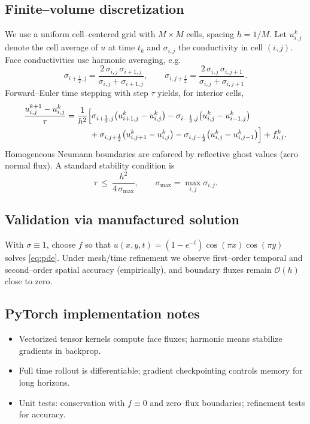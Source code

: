 \documentclass[11pt,a4paper]{article}
\numberwithin{equation}{section}
\newcommand{\Oh}{\mathcal{O}}
\begin{document}
\subsection{Finite--volume discretization}
We use a uniform cell--centered grid with $M\times M$ cells, spacing $h=1/M$.
Let $u^k_{i,j}$ denote the cell average of $u$ at time $t_k$ and $\sigma_{i,j}$ the conductivity in cell $(i,j)$.
Face conductivities use harmonic averaging, e.g.
\begin{equation}
  \sigma_{i+\frac12,j}=\frac{2\,\sigma_{i,j}\,\sigma_{i+1,j}}{\sigma_{i,j}+\sigma_{i+1,j}},
  \qquad
  \sigma_{i,j+\frac12}=\frac{2\,\sigma_{i,j}\,\sigma_{i,j+1}}{\sigma_{i,j}+\sigma_{i,j+1}}.
\end{equation}
Forward--Euler time stepping with step $\tau$ yields, for interior cells,
\begin{align}
\frac{u^{k+1}_{i,j}-u^{k}_{i,j}}{\tau} 
&= \frac{1}{h^2}\Big[
  \sigma_{i+\frac12,j}\big(u^k_{i+1,j}-u^k_{i,j}\big)
 -\sigma_{i-\frac12,j}\big(u^k_{i,j}-u^k_{i-1,j}\big) \nonumber\\
&\hspace{2.8em}
 +\sigma_{i,j+\frac12}\big(u^k_{i,j+1}-u^k_{i,j}\big)
 -\sigma_{i,j-\frac12}\big(u^k_{i,j}-u^k_{i,j-1}\big)\Big]
 + f^k_{i,j}.
 \label{eq:update}
\end{align}
Homogeneous Neumann boundaries are enforced by reflective ghost values (zero normal flux).
A standard stability condition is
\begin{equation}
  \tau \ \le\ \frac{h^2}{4\,\sigma_{\max}}, 
  \qquad \sigma_{\max} = \max_{i,j}\sigma_{i,j}.
  \label{eq:cfl}
\end{equation}

\subsection{Validation via manufactured solution}
With $\sigma\equiv 1$, choose $f$ so that 
$u(x,y,t)=(1-e^{-t})\cos(\pi x)\cos(\pi y)$ solves \eqref{eq:pde}.
Under mesh/time refinement we observe first--order temporal and second--order spatial accuracy (empirically), and boundary fluxes remain $\Oh(h)$ close to zero.

\subsection{PyTorch implementation notes}
\begin{itemize}[leftmargin=1.25em]
  \item Vectorized tensor kernels compute face fluxes; harmonic means stabilize gradients in backprop.
  \item Full time rollout is differentiable; gradient checkpointing controls memory for long horizons.
  \item Unit tests: conservation with $f\equiv 0$ and zero--flux boundaries; refinement tests for accuracy.
\end{itemize}
\end{document}

